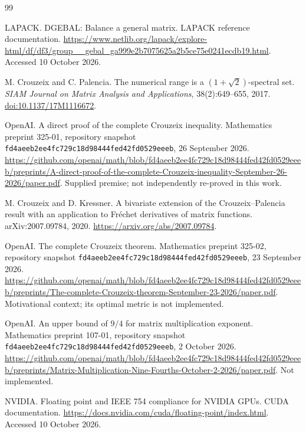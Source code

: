 \documentclass[10pt]{article}
\begin{document}
\begin{thebibliography}{99}

LAPACK.
\newblock DGEBAL: Balance a general matrix.
\newblock LAPACK reference documentation.
\newblock \url{https://www.netlib.org/lapack/explore-html/df/df3/group__gebal_ga999e2b7075625a2b5ce75e0241ecdb19.html}.
\newblock Accessed 10 October 2026.

M. Crouzeix and C. Palencia.
\newblock The numerical range is a $(1+\sqrt{2})$-spectral set.
\newblock \emph{SIAM Journal on Matrix Analysis and Applications}, 38(2):649--655, 2017.
\newblock \href{https://doi.org/10.1137/17M1116672}{doi:10.1137/17M1116672}.

OpenAI.
\newblock A direct proof of the complete Crouzeix inequality.
\newblock Mathematics preprint 325-01, repository snapshot
\texttt{fd4aeeb2ee4fc729c18d98444fed42fd0529eeeb}, 26 September 2026.
\newblock \url{https://github.com/openai/math/blob/fd4aeeb2ee4fc729c18d98444fed42fd0529eeeb/preprints/A-direct-proof-of-the-complete-Crouzeix-inequality-September-26-2026/paper.pdf}.
\newblock Supplied premise; not independently re-proved in this work.

M. Crouzeix and D. Kressner.
\newblock A bivariate extension of the Crouzeix--Palencia result with an application to Fr\'echet derivatives of matrix functions.
\newblock arXiv:2007.09784, 2020.
\newblock \url{https://arxiv.org/abs/2007.09784}.

OpenAI.
\newblock The complete Crouzeix theorem.
\newblock Mathematics preprint 325-02, repository snapshot
\texttt{fd4aeeb2ee4fc729c18d98444fed42fd0529eeeb}, 23 September 2026.
\newblock \url{https://github.com/openai/math/blob/fd4aeeb2ee4fc729c18d98444fed42fd0529eeeb/preprints/The-complete-Crouzeix-theorem-September-23-2026/paper.pdf}.
\newblock Motivational context; its optimal metric is not implemented.

OpenAI.
\newblock An upper bound of $9/4$ for matrix multiplication exponent.
\newblock Mathematics preprint 107-01, repository snapshot
\texttt{fd4aeeb2ee4fc729c18d98444fed42fd0529eeeb}, 2 October 2026.
\newblock \url{https://github.com/openai/math/blob/fd4aeeb2ee4fc729c18d98444fed42fd0529eeeb/preprints/Matrix-Multiplication-Nine-Fourths-October-2-2026/paper.pdf}.
\newblock Not implemented.

NVIDIA.
\newblock Floating point and IEEE 754 compliance for NVIDIA GPUs.
\newblock CUDA documentation.
\newblock \url{https://docs.nvidia.com/cuda/floating-point/index.html}.
\newblock Accessed 10 October 2026.


\end{thebibliography}
\end{document}
